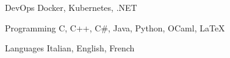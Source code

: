 

\begin{cvskills}

  \cvskill
    {DevOps} %
    {Docker, Kubernetes, .NET} %



  \cvskill
    {Programming} %
		{C, C++, C\#, Java, Python, OCaml, LaTeX} %

  \cvskill
    {Languages} %
    {Italian, English, French} %

\end{cvskills}
